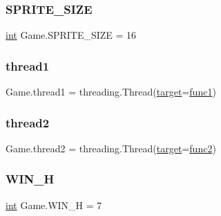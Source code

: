 \mbox{\label{class_game_a54d3bb2d75dd10ce20a72da67d73b898}} 
\subsubsection{\texorpdfstring{SPRITE\_SIZE}{SPRITE\_SIZE}}
{\footnotesize\ttfamily \mbox{\hyperlink{warnings_8h_a74f207b5aa4ba51c3a2ad59b219a423b}{int}} Game.\+S\+P\+R\+I\+T\+E\+\_\+\+S\+I\+ZE = 16}

\mbox{\label{class_game_a6d717106010fb16b734c03c9b147d0a4}} 
\subsubsection{\texorpdfstring{thread1}{thread1}}
{\footnotesize\ttfamily Game.\+thread1 = threading.\+Thread(\mbox{\hyperlink{_s_d_l__opengl__glext_8h_af9d0cbbbeb7414e786c41899e5a856d7}{target}}=\mbox{\hyperlink{namespace_game_a0a46e1967198035abbe8eb1cde4d95ba}{func1}})}

\mbox{\label{class_game_acc08a249af8743e6b07bf588cd94b930}} 
\subsubsection{\texorpdfstring{thread2}{thread2}}
{\footnotesize\ttfamily Game.\+thread2 = threading.\+Thread(\mbox{\hyperlink{_s_d_l__opengl__glext_8h_af9d0cbbbeb7414e786c41899e5a856d7}{target}}=\mbox{\hyperlink{namespace_game_ae3908fde602ee2498ff3e95476ae78ed}{func2}})}

\mbox{\label{class_game_a59e081cafbf5991c96838c09806319f9}} 
\subsubsection{\texorpdfstring{WIN\_H}{WIN\_H}}
{\footnotesize\ttfamily \mbox{\hyperlink{warnings_8h_a74f207b5aa4ba51c3a2ad59b219a423b}{int}} Game.\+W\+I\+N\+\_\+H = 7}

\mbox{\label{class_game_a6af3a4730712fed523037d4a2cf0beab}} 
